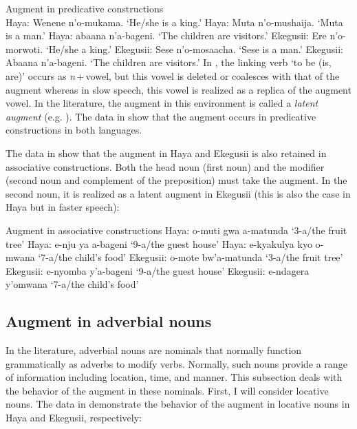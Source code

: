 \documentclass[output=paper]{langscibook}
\begin{document}
\ea Augment in predicative constructions\smallskip\\
\label{hayagusii12}
  \ea\label{hayagusii12a}	 Haya:\hphantom{isit} 		Wenene n’o-mukama.		‘He/she is a king.’
  \ex\label{hayagusii12b} 	Haya:\hphantom{isit} 		Muta n’o-mushaija.\hphantom{na}		‘Muta is a man.’
  \ex\label{hayagusii12c} 	Haya:\hphantom{isit} 		abaana n’a-bageni.\hphantom{ma}		‘The children are visitors.’
  \ex\label{hayagusii12d} 	Ekegusii: 	Ere n’o-morwoti.\hphantom{amal}		‘He/she a king.’
  \ex\label{hayagusii12e} 	Ekegusii: 	Sese n’o-mosaacha.\hphantom{na}		‘Sese is a man.’
  \ex\label{hayagusii12f} 	Ekegusii: 	Abaana n’a-bageni.\hphantom{na}		‘The children are visitors.’
  \z
\z
In , the linking verb `to be (is, are)' occurs as \textit{n}\,+\,vowel, but this vowel is deleted or coalesces with that of the augment whereas in slow speech, this vowel is realized as a replica of the augment vowel. In the literature, the augment in this environment is called a \textit{latent augment} (e.g. \citealt{blois1970augment}). The data in  show that the augment occurs in predicative constructions in both languages.

The data in  show that the augment in Haya and Ekegusii is also retained in associative constructions. Both the head noun (first noun) and the modifier (second noun and complement of the preposition) must take the augment. In the second noun, it is realized as a latent augment in Ekegusii (this is also the case in Haya but in faster speech):

\ea Augment in associative constructions\smallskip
\label{hayagusii13}
  \ea\label{hayagusii13a} 	Haya:\hphantom{isit} 		{o-muti gwa a-matunda}\hphantom{na} 	‘3-a/the fruit tree’
  \ex\label{hayagusii13b} 	Haya:\hphantom{isit} 		{e-nju ya a-bageni}\hphantom{imwana}		‘9-a/the guest house’
  \ex\label{hayagusii13c} 	Haya:\hphantom{isit} 		{e-kyakulya kyo o-mwana}	 ‘7-a/the child’s food’
  \ex\label{hayagusii13d} 	Ekegusii: 	{o-mote bw’a-matunda}\hphantom{ina}		‘3-a/the fruit tree’
  \ex\label{hayagusii13e} 	Ekegusii: 	{e-nyomba y’a-bageni}\hphantom{iana}		‘9-a/the guest house’
  \ex\label{hayagusii13f} 	Ekegusii: 	{e-ndagera y’omwana}\hphantom{tana}		‘7-a/the child’s food’
  \z
\z


\subsection{Augment in adverbial nouns}
In the literature, adverbial nouns are nominals that normally function grammatically as adverbs to modify verbs. Normally, such nouns provide a range of information including location, time, and manner. This subsection deals with the behavior of the augment in these nominals. First, I will consider locative nouns. The data in  demonstrate the behavior of the augment in locative nouns in Haya and Ekegusii, respectively:\pagebreak
\end{document}
